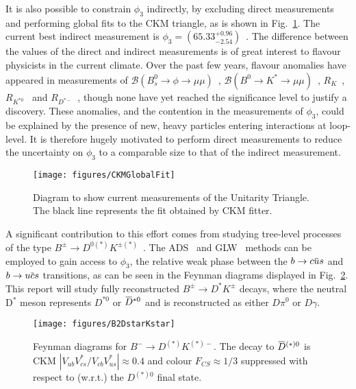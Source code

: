 \documentclass[oneside,12pt]{article}
\newcommand{\overbar}[1]{\mkern 1.5mu\overline{\mkern-1.5mu#1\mkern-1.5mu}\mkern
1.5mu}
\begin{document}
It is also possible to constrain $\phi_3$ indirectly, by excluding direct
measurements and performing global fits to the CKM triangle, as is shown in
Fig.~\ref{fig:CKMGlobalFit}. The current best indirect measurement is
$\phi_3=(65.33^{+0.96}_{-2.54})$\degree~\cite{website:CKMFitter}. The difference
between the values of the direct and indirect measurements is of great interest
to flavour physicists in the current climate. Over the past few years, flavour
anomalies have appeared in measurements of $\mathcal{B} (B^{0}_{s}\rightarrow
\phi \rightarrow \mu \mu)$~\cite{B2phimumu}, $\mathcal{B} (B^{0}\rightarrow
K^{*}\rightarrow \mu \mu)$~\cite{B2Kstmumu}, $R_{K}$~\cite{Rk},
$R_{K^{*0}}$~\cite{Rkst} and $R_{D^{*-}}$~\cite{RDst}, though none have yet
reached the significance level to justify a discovery. These anomalies, and the
contention in the measurements of $\phi_3$, could be explained by the presence
of new, heavy particles entering interactions at loop-level. It is therefore
hugely motivated to perform direct measurements to reduce the uncertainty on
$\phi_{3}$ to a comparable size to that of the indirect measurement.
\begin{figure}[H]
  \centering \texttt{[image: figures/CKMGlobalFit]}
  \caption{\small{Diagram to show current measurements of the Unitarity
  Triangle. The black line represents the fit obtained by CKM fitter.}}
  \label{fig:CKMGlobalFit} \vspace{-10pt}
\end{figure}
A significant contribution to this effort comes from studying
tree-level processes of the type $B^{\pm}\rightarrow D^{0(*)}K^{\pm
(*)}$~\cite{B2DKD2hh, DalitzRun1, DalitzRun2, B2DKstD2hh, B2DstKD2hh}. The
ADS~\cite{ADSRef} and GLW~\cite{GLWRef} methods can be employed to gain access
to $\phi_3$, the relative weak phase between the $b\rightarrow c\overbar{u}s$
and $b\rightarrow u\overbar{c}s$ transitions, as can be seen in the Feynman
diagrams displayed in Fig.~\ref{fig:B2DstarKstar}. This report will study fully
reconstructed $B^{\pm}\rightarrow D^{*}K^{\pm}$ decays, where the neutral
D$^{*}$ meson represents $D^{*0}$ or $\overbar{D}^{*0}$ and is reconstructed as
either $D\pi^{0}$ or $D\gamma$. 
\begin{figure}[H]
  \centering \texttt{[image: figures/B2DstarKstar]}
  \caption{\small{Feynman diagrams for ${B}^{-}\rightarrow{D}^{(*)}{K}^{(*)-}$}.
  The decay to $\overbar{{D}}^{(*)0}$ is CKM
  $|V_{ub}V^{*}_{cs}/V_{cb}V^{*}_{us}|\approx0.4$ and colour
  ${F}_{CS}\approx1/3$ suppressed with respect to (w.r.t.) the ${D}^{(*)0}$
  final state.} \label{fig:B2DstarKstar} \vspace{-10pt}
\end{figure}
\end{document}
